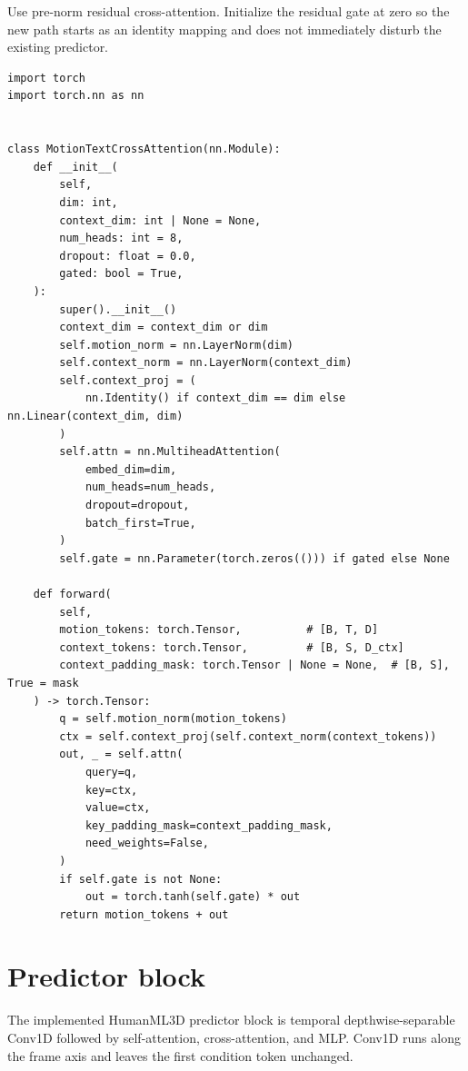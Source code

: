 \documentclass[11pt]{article}
\begin{document}
Use pre-norm residual cross-attention. Initialize the residual gate at zero so
the new path starts as an identity mapping and does not immediately disturb the
existing predictor.

\begin{lstlisting}[style=python]
import torch
import torch.nn as nn


class MotionTextCrossAttention(nn.Module):
    def __init__(
        self,
        dim: int,
        context_dim: int | None = None,
        num_heads: int = 8,
        dropout: float = 0.0,
        gated: bool = True,
    ):
        super().__init__()
        context_dim = context_dim or dim
        self.motion_norm = nn.LayerNorm(dim)
        self.context_norm = nn.LayerNorm(context_dim)
        self.context_proj = (
            nn.Identity() if context_dim == dim else nn.Linear(context_dim, dim)
        )
        self.attn = nn.MultiheadAttention(
            embed_dim=dim,
            num_heads=num_heads,
            dropout=dropout,
            batch_first=True,
        )
        self.gate = nn.Parameter(torch.zeros(())) if gated else None

    def forward(
        self,
        motion_tokens: torch.Tensor,          # [B, T, D]
        context_tokens: torch.Tensor,         # [B, S, D_ctx]
        context_padding_mask: torch.Tensor | None = None,  # [B, S], True = mask
    ) -> torch.Tensor:
        q = self.motion_norm(motion_tokens)
        ctx = self.context_proj(self.context_norm(context_tokens))
        out, _ = self.attn(
            query=q,
            key=ctx,
            value=ctx,
            key_padding_mask=context_padding_mask,
            need_weights=False,
        )
        if self.gate is not None:
            out = torch.tanh(self.gate) * out
        return motion_tokens + out
\end{lstlisting}

\section{Predictor block}

The implemented HumanML3D predictor block is temporal depthwise-separable
Conv1D followed by self-attention, cross-attention, and MLP. Conv1D runs along
the frame axis and leaves the first condition token unchanged.
\end{document}
